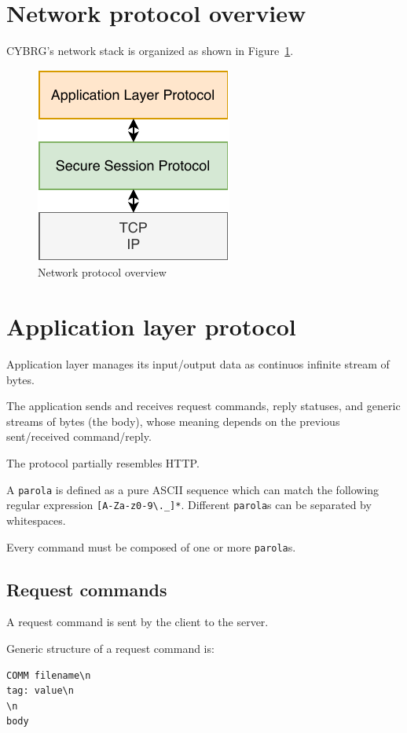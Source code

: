 \documentclass[a4paper,12pt]{article}
\newcommand{\projectname}{CYBRG}
\begin{document}
\section{Network protocol overview}
\projectname{}'s network stack is organized as shown in Figure~\ref{img:protocol}.

\begin{figure}[H]
  \centering
  \includegraphics{img/protocol.pdf}
  \caption{Network protocol overview}
  \label{img:protocol}
\end{figure}

\section{Application layer protocol}
Application layer manages its input/output data as continuos infinite stream of bytes.

The application sends and receives request commands, reply statuses, and generic streams of bytes (the body), whose meaning depends on the previous sent/received command/reply.

The protocol partially resembles HTTP.

A \texttt{parola} is defined as a pure ASCII sequence which can match the following regular expression \texttt{[A-Za-z0-9\textbackslash.\_]*}.
Different \texttt{parola}s can be separated by whitespaces.

Every command must be composed of one or more \texttt{parola}s.

\subsection{Request commands}
A request command is sent by the client to the server.

Generic structure of a request command is:
\begin{verbatim}
COMM filename\n
tag: value\n
\n
body
\end{verbatim}
\end{document}

